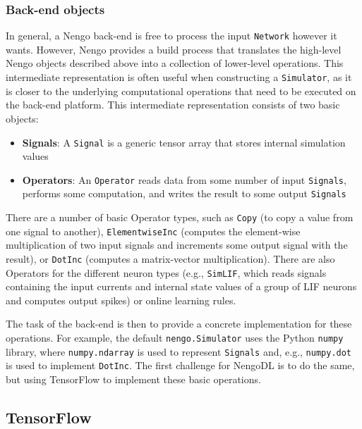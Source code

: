 \documentclass{article}
\begin{document}
\subsubsection{Back-end objects}

In general, a Nengo back-end is free to process the input \texttt{Network} however it wants.  However, Nengo provides a build process that translates the high-level Nengo objects described above into a collection of lower-level operations.  This intermediate representation is often useful when constructing a \texttt{Simulator}, as it is closer to the underlying computational operations that need to be executed on the back-end platform.  This intermediate representation consists of two basic objects:

\begin{itemize}
\item {\bf Signals}: A \texttt{Signal} is a generic tensor array that stores internal simulation values
\item {\bf Operators}: An \texttt{Operator} reads data from some number of input \texttt{Signals}, performs some computation, and writes the result to some output \texttt{Signals}
\end{itemize}

There are a number of basic Operator types, such as \texttt{Copy} (to copy a value from one signal to another), \texttt{ElementwiseInc} (computes the element-wise multiplication of two input signals and increments some output signal with the result), or \texttt{DotInc} (computes a matrix-vector multiplication).  There are also Operators for the different neuron types (e.g., \texttt{SimLIF}, which reads signals containing the input currents and internal state values of a group of LIF neurons and computes output spikes) or online learning rules.


The task of the back-end is then to provide a concrete implementation for these operations.  For example, the default \texttt{nengo.Simulator} uses the Python \texttt{numpy} library, where \texttt{numpy.ndarray} is used to represent \texttt{Signals} and, e.g., \texttt{numpy.dot} is used to implement \texttt{DotInc}.  The first challenge for NengoDL is to do the same, but using TensorFlow to implement these basic operations.

\subsection{TensorFlow}
\end{document}
